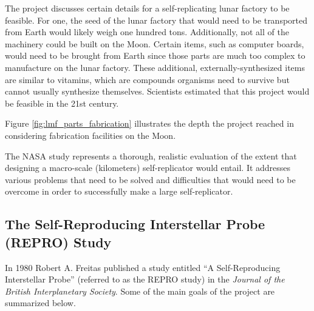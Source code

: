 

The project discusses certain details for a self-replicating lunar factory to be feasible. For one, the seed of the lunar factory that would need to be transported from Earth would likely weigh one hundred tons. Additionally, not all of the machinery could be built on the Moon. Certain items, such as computer boards, would need to be brought from Earth since 
those parts are much too complex to manufacture on the lunar factory.
These additional, externally-synthesized items are similar to vitamins, which are compounds organisms need to survive but cannot usually synthesize themselves.  Scientists estimated that this project would be feasible in the 21st century.

Figure \ref{fig:lmf_parts_fabrication} illustrates the depth the project reached in considering
fabrication facilities on the Moon.


The NASA study represents a thorough, realistic evaluation of the extent that designing a macro-scale (kilometers) self-replicator would entail. It addresses various problems that need to be solved and difficulties that would need to be overcome in order to successfully make a large self-replicator.

\subsection[The Self{}-Reproducing Interstellar Probe (REPRO) Study]{The
Self-Reproducing Interstellar Probe (REPRO) Study}

In 1980 Robert A. Freitas
published a study entitled ``A Self-Reproducing Interstellar Probe'' (referred to as the REPRO study) in
the \textit{Journal of the British Interplanetary Society}. Some of the
main goals of the project are summarized below.

